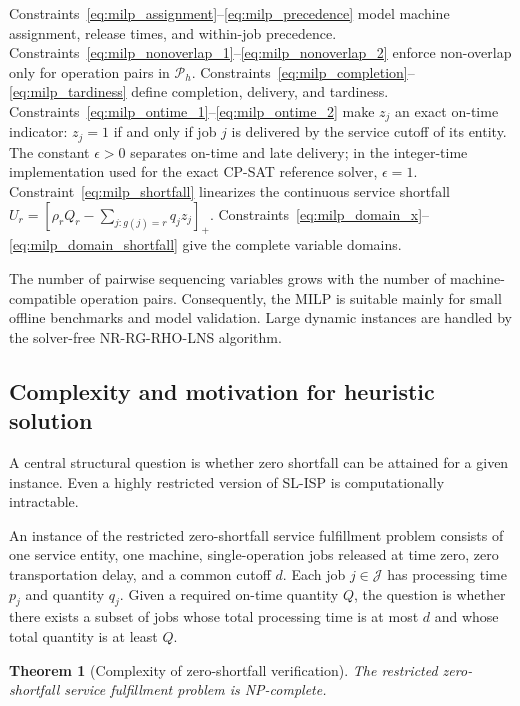 \documentclass[a4paper,fleqn]{cas-sc}
\newtheorem{theorem}{Theorem}
\begin{document}
Constraints~\eqref{eq:milp_assignment}--\eqref{eq:milp_precedence} model machine assignment, release times, and within-job precedence. Constraints~\eqref{eq:milp_nonoverlap_1}--\eqref{eq:milp_nonoverlap_2} enforce non-overlap only for operation pairs in \(\mathcal P_h\). Constraints~\eqref{eq:milp_completion}--\eqref{eq:milp_tardiness} define completion, delivery, and tardiness. Constraints~\eqref{eq:milp_ontime_1}--\eqref{eq:milp_ontime_2} make \(z_j\) an exact on-time indicator: \(z_j=1\) if and only if job \(j\) is delivered by the service cutoff of its entity. The constant \(\epsilon>0\) separates on-time and late delivery; in the integer-time implementation used for the exact CP-SAT reference solver, \(\epsilon=1\). Constraint~\eqref{eq:milp_shortfall} linearizes the continuous service shortfall \(U_r=[\rho_rQ_r-\sum_{j:g(j)=r}q_jz_j]_+\). Constraints~\eqref{eq:milp_domain_x}--\eqref{eq:milp_domain_shortfall} give the complete variable domains.

The number of pairwise sequencing variables grows with the number of machine-compatible operation pairs. Consequently, the MILP is suitable mainly for small offline benchmarks and model validation. Large dynamic instances are handled by the solver-free NR-RG-RHO-LNS algorithm.

\subsection{Complexity and motivation for heuristic solution}
\label{sec:complexity}

A central structural question is whether zero shortfall can be attained for a given instance. Even a highly restricted version of SL-ISP is computationally intractable.

\begin{definition}
\label{def:rzssfp}
An instance of the restricted zero-shortfall service fulfillment problem consists of one service entity, one machine, single-operation jobs released at time zero, zero transportation delay, and a common cutoff \(d\). Each job \(j\in\mathcal J\) has processing time \(p_j\) and quantity \(q_j\). Given a required on-time quantity \(Q\), the question is whether there exists a subset of jobs whose total processing time is at most \(d\) and whose total quantity is at least \(Q\).
\end{definition}

\begin{theorem}[Complexity of zero-shortfall verification]
\label{thm:np_complete}
The restricted zero-shortfall service fulfillment problem is NP-complete.
\end{theorem}
\end{document}

